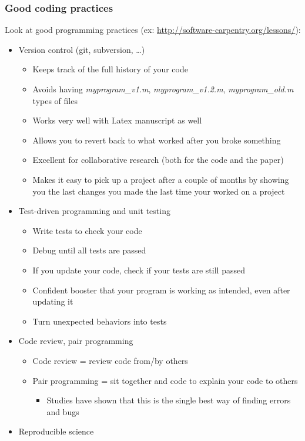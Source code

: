 \documentclass[screen, aspectratio=43]{beamer}
\begin{document}
\begin{frame}
  \frametitle{Good coding practices}
Look at good programming practices (ex: \url{http://software-carpentry.org/lessons/}):
\begin{itemize}
\item Version control (git, subversion, \ldots)
  \begin{itemize}[<only@1>]
  \item Keeps track of the full history of your code
  \item Avoids having \emph{myprogram\_v1.m}, \emph{myprogram\_v1.2.m}, \emph{myprogram\_old.m} types of files
  \item Works very well with Latex manuscript as well
  \item Allows you to revert back to what worked after you broke something
  \item Excellent for collaborative research (both for the code and the paper)
  \item Makes it easy to pick up a project after a couple of months by showing you the last changes you made the last time your worked on a project
  \end{itemize}
\item Test-driven programming and unit testing
  \begin{itemize}[<only@2>]
  \item Write tests to check your code
  \item Debug until all tests are passed
  \item If you update your code, check if your tests are still passed
  \item Confident booster that your program is working as intended, even after updating it
  \item Turn unexpected behaviors into tests
  \end{itemize}
\item Code review, pair programming
  \begin{itemize}[<only@3>]
  \item Code review = review code from/by others
  \item Pair programming = sit together and code to explain your code to others
    \begin{itemize}
    \item Studies have shown that this is the single best way of finding errors and bugs
    \end{itemize}
  \end{itemize}
\item Reproducible science

\end{itemize}
\end{frame}
\end{document}
